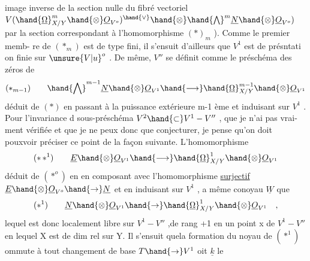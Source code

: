 
image inverse de la section nulle du fibré vectoriel $V(\hand{\underline{\Omega}}^m_{X/Y}\hand{\otimes}\underline{O}_{V^o})^{\hand{\vee}}\hand{\otimes}\hand{\bigwedge}^m\underline{N}\hand{\otimes}\underline{O}_{V^o})$
par la section correspondant à l'homomorphisme $(*)_{m}$ ). Comme le premier memb-%
re de $(*_m)$ est de type fini, il s'ensuit d'ailleurs que $V^1$ est de présntati%
on finie sur $\unsure{V|u}^o$ . De même, $V''$ se définit comme le préschéma des zéros de
\[ (*_{m-1}) \qquad \hand{\bigwedge}^{m-1}\underline{N}\hand{\otimes}\underline{O}_{V^1} \hand{\longrightarrow} \hand{\underline{\Omega}}^{m-1}_{X/Y}\hand{\otimes}\underline{O}_{V^1} \]
déduit de $(*)$ en passant à la puissance extérieure m-1 ème et induisant sur
$V^1$ . Pour l'invariance d sous-préschéma $V^2\hand{\subset} V^1-V''$ , que je n'ai pas vrai-%
ment vérifiée et que je ne peux donc que conjecturer, je pense qu'on doit
pouxvoir préciser ce point de la façon suivante. L'homomorphisme
\[ (*\,*^1) \qquad \underline{E}\hand{\otimes}\underline{O}_{V^1}\hand{\longrightarrow}\hand{\underline{\Omega}}^1_{X/Y}\hand{\otimes}\underline{O}_{V^1} \]
déduit de $(*^o)$ en  en composant avec l'homomorphisme
\uline{surjectif} $\underline{E}\hand{\otimes}\underline{O}_{V^o}\hand{\to}\underline{N}$ et en  induisant sur $V^1$ , a même conoyau
$\underline{W}$ que
\[ (*^1) \qquad \underline{N}\hand{\otimes}\underline{O}_{V^1}\hand{\to}\hand{\underline{\Omega}}^1_{X/Y}\hand{\otimes}\underline{O}_{V^1} \quad , \]
lequel  est donc localement libre sur $V^1-V''$ ,\hand{(}de rang +1 en un point
x de $V^1-V''$ en lequel X est de dim rel  sur Y\hand{)}. Il s'ensuit quela formation
du noyau de $(*^1)$ ommute à tout changement de base $T\hand{\to} V^1$ oit $\underline{k}$ le
